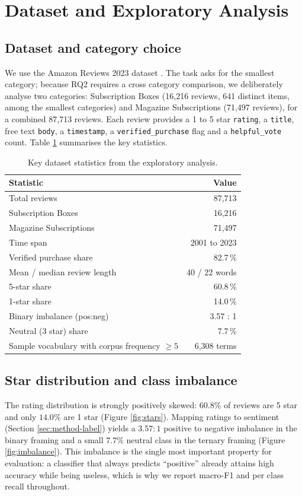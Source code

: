 \documentclass[11pt,a4paper,DIV=12]{scrartcl}
\begin{document}
\section{Dataset and Exploratory Analysis}
\label{sec:eda}

\subsection{Dataset and category choice}
We use the Amazon Reviews 2023 dataset \citep{hou2024bridging}. The task asks for
the smallest category; because RQ2 requires a cross category comparison,
we deliberately analyse two categories: Subscription Boxes
(16{,}216 reviews, 641 distinct items, among the smallest categories) and
Magazine Subscriptions (71{,}497 reviews), for a combined
87{,}713 reviews. Each review provides a 1 to 5 star \texttt{rating}, a
\texttt{title}, free text \texttt{body}, a \texttt{timestamp}, a
\texttt{verified\_purchase} flag and a \texttt{helpful\_vote} count. Table
\ref{tab:eda} summarises the key statistics.

\begin{table}[H]
\centering
\caption{Key dataset statistics from the exploratory analysis.}
\label{tab:eda}
\begin{tabular}{lr}
\toprule
Statistic & Value \\
\midrule
Total reviews & 87{,}713 \\
\quad Subscription Boxes & 16{,}216 \\
\quad Magazine Subscriptions & 71{,}497 \\
Time span & 2001 to 2023 \\
Verified purchase share & 82.7\,\% \\
Mean / median review length & 40 / 22 words \\
5-star share & 60.8\,\% \\
1-star share & 14.0\,\% \\
Binary imbalance (pos:neg) & 3.57 : 1 \\
Neutral (3 star) share & 7.7\,\% \\
Sample vocabulary with corpus frequency \(\geq 5\) & 6{,}308 terms \\
\bottomrule
\end{tabular}
\end{table}

\subsection{Star distribution and class imbalance}
The rating distribution is strongly positively skewed: $60.8\%$ of reviews are
5 star and only $14.0\%$ are 1 star (Figure \ref{fig:stars}). Mapping ratings to
sentiment (Section \ref{sec:method-label}) yields a $3.57\!:\!1$
positive to negative imbalance in the binary framing and a small $7.7\%$ neutral
class in the ternary framing (Figure \ref{fig:imbalance}). This imbalance is the
single most important property for evaluation: a classifier that always predicts
``positive'' already attains high accuracy while being useless, which is why we
report macro-F1 and per class recall throughout.
\end{document}
